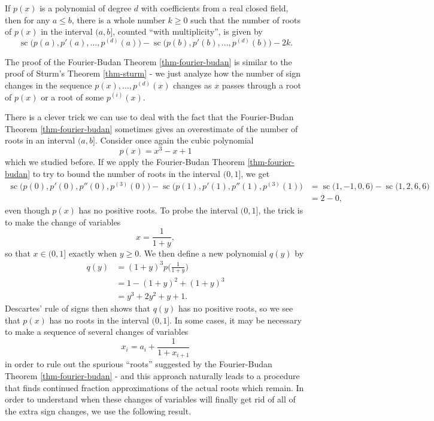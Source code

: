 \begin{thm}\label{thm-fourier-budan} If $p(x)$ is a polynomial of degree $d$ with coefficients from a real closed field, then for any $a \le b$, there is a whole number $k \ge 0$ such that the number of roots of $p(x)$ in the interval $(a,b]$, counted ``with multiplicity'', is given by
\[
\operatorname{sc}\big(p(a), p'(a), ..., p^{(d)}(a)\big) - \operatorname{sc}\big(p(b), p'(b), ..., p^{(d)}(b)\big) - 2k.
\]
\end{thm}

The proof of the Fourier-Budan Theorem \ref{thm-fourier-budan} is similar to the proof of Sturm's Theorem \ref{thm-sturm} - we just analyze how the number of sign changes in the sequence $p(x), ..., p^{(d)}(x)$ changes as $x$ passes through a root of $p(x)$ or a root of some $p^{(i)}(x)$.

There is a clever trick we can use to deal with the fact that the Fourier-Budan Theorem \ref{thm-fourier-budan} sometimes gives an overestimate of the number of roots in an interval $(a,b]$. Consider once again the cubic polynomial
\[
p(x) = x^3 - x + 1
\]
which we studied before. If we apply the Fourier-Budan Theorem \ref{thm-fourier-budan} to try to bound the number of roots in the interval $(0,1]$, we get
\begin{align*}
\operatorname{sc}\big(p(0), p'(0), p''(0), p^{(3)}(0)\big) - \operatorname{sc}\big(p(1), p'(1), p''(1), p^{(3)}(1)\big) &= \operatorname{sc}\big(1, -1, 0, 6\big) - \operatorname{sc}\big(1, 2, 6, 6\big)\\
&= 2 - 0,
\end{align*}
even though $p(x)$ has no positive roots. To probe the interval $(0,1]$, the trick is to make the change of variables
\[
x = \frac{1}{1+y},
\]
so that $x \in (0,1]$ exactly when $y \ge 0$. We then define a new polynomial $q(y)$ by
\begin{align*}
q(y) &= (1+y)^3 p\Big(\frac{1}{1+y}\Big)\\
&= 1 - (1+y)^2 + (1+y)^3\\
&= y^3 + 2y^2 + y + 1.
\end{align*}
Descartes' rule of signs then shows that $q(y)$ has no positive roots, so we see that $p(x)$ has no roots in the interval $(0,1]$. In some cases, it may be necessary to make a sequence of several changes of variables
\[
x_i = a_i + \frac{1}{1 + x_{i+1}}
\]
in order to rule out the spurious ``roots'' suggested by the Fourier-Budan Theorem \ref{thm-fourier-budan} - and this approach naturally leads to a procedure that finds continued fraction approximations of the actual roots which remain. In order to understand when these changes of variables will finally get rid of all of the extra sign changes, we use the following result.

